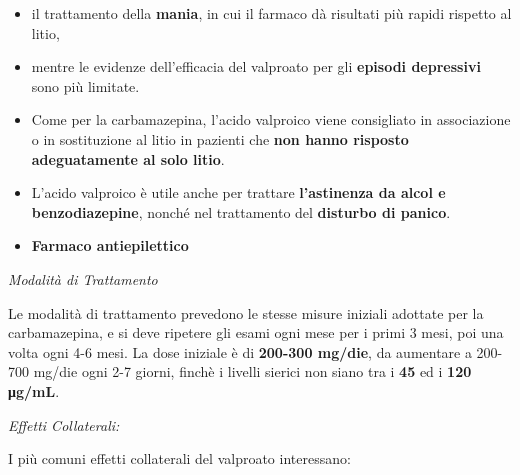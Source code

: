 \documentclass[]{article}
\begin{document}
\begin{itemize}
\item
  il trattamento della \textbf{mania}, in cui il farmaco dà risultati
  più rapidi rispetto al litio,
\item
  mentre le evidenze dell'efficacia del valproato per gli
  \textbf{episodi depressivi} sono più limitate.
\item
  Come per la carbamazepina, l'acido valproico viene consigliato in
  associazione o in sostituzione al litio in pazienti che \textbf{non
  hanno risposto adeguatamente al solo litio}.
\item
  L'acido valproico è utile anche per trattare \textbf{l'astinenza da
  alcol e benzodiazepine}, nonché nel trattamento del \textbf{disturbo
  di panico}.
\item
  \textbf{Farmaco antiepilettico}
\end{itemize}

\emph{\emph{Modalità di Trattamento}}

Le modalità di trattamento prevedono le stesse misure iniziali adottate
per la carbamazepina, e si deve ripetere gli esami ogni mese per i primi
3 mesi, poi una volta ogni 4-6 mesi. La dose iniziale è di
\textbf{200-300 mg/die}, da aumentare a 200-700 mg/die ogni 2-7 giorni,
finchè i livelli sierici non siano tra i \textbf{45} ed i \textbf{120
μg/mL}.

\emph{\emph{Effetti Collaterali:}}

I più comuni effetti collaterali del valproato interessano:
\end{document}
